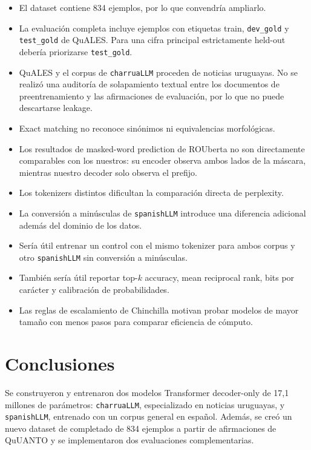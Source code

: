 \documentclass[11pt,a4paper]{article}
\newcommand{\charrua}{\texttt{charruaLLM}}
\newcommand{\spanishmodel}{\texttt{spanishLLM}}
\newcommand{\code}[1]{\texttt{#1}}
\begin{document}
\begin{itemize}
    \item El dataset contiene 834 ejemplos, por lo que convendría ampliarlo.
    \item La evaluación completa incluye ejemplos con etiquetas train,
          \code{dev\_gold} y \code{test\_gold} de QuALES. Para una cifra
          principal estrictamente held-out debería priorizarse
          \code{test\_gold}.
    \item QuALES y el corpus de \charrua{} proceden de noticias uruguayas. No
          se realizó una auditoría de solapamiento textual entre los documentos
          de preentrenamiento y las afirmaciones de evaluación, por lo que no
          puede descartarse leakage.
    \item Exact matching no reconoce sinónimos ni equivalencias morfológicas.
    \item Los resultados de masked-word prediction de ROUberta no son
          directamente comparables con los nuestros: su encoder observa ambos
          lados de la máscara, mientras nuestro decoder solo observa el prefijo.
    \item Los tokenizers distintos dificultan la comparación directa de
          perplexity.
    \item La conversión a minúsculas de \spanishmodel{} introduce una
          diferencia adicional además del dominio de los datos.
    \item Sería útil entrenar un control con el mismo tokenizer para ambos
          corpus y otro \spanishmodel{} sin conversión a minúsculas.
    \item También sería útil reportar top-$k$ accuracy, mean reciprocal rank,
          bits por carácter y calibración de probabilidades.
    \item Las reglas de escalamiento de Chinchilla motivan probar modelos de
          mayor tamaño con menos pasos para comparar eficiencia de cómputo.
\end{itemize}


\section{Conclusiones}

Se construyeron y entrenaron dos modelos Transformer decoder-only de 17,1
millones de parámetros: \charrua, especializado en noticias uruguayas, y
\spanishmodel, entrenado con un corpus general en español. Además, se creó un
nuevo dataset de completado de 834 ejemplos a partir de afirmaciones de QuUANTO
y se implementaron dos evaluaciones complementarias.
\end{document}
